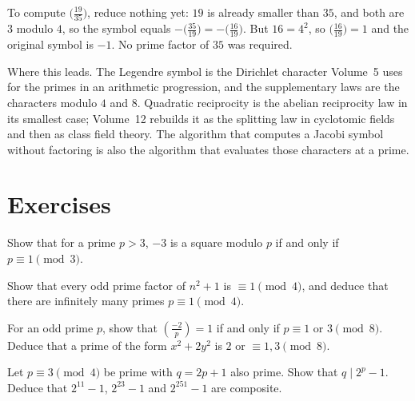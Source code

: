 \begin{examplex}
To compute $\bigl(\frac{19}{35}\bigr)$, reduce nothing yet: $19$ is already smaller than $35$, and both are $3$ modulo $4$, so the symbol equals $-\bigl(\frac{35}{19}\bigr)=-\bigl(\frac{16}{19}\bigr)$.
But $16=4^2$, so $\bigl(\frac{16}{19}\bigr)=1$ and the original symbol is $-1$.
No prime factor of $35$ was required.
\end{examplex}

\begin{beauty}
Where this leads. The Legendre symbol is the Dirichlet character Volume~5 uses for the primes in an arithmetic progression, and the supplementary laws are the characters modulo $4$ and $8$. Quadratic reciprocity is the abelian reciprocity law in its smallest case; Volume~12 rebuilds it as the splitting law in cyclotomic fields and then as class field theory. The algorithm that computes a Jacobi symbol without factoring is also the algorithm that evaluates those characters at a prime.
\end{beauty}

\section{Exercises}

\begin{exercise}[$\star$]\label{ex:minus3}
Show that for a prime $p>3$, $-3$ is a square modulo $p$ if and only if $p\equiv1\pmod3$.
\end{exercise}

\begin{exercise}[$\star$]\label{ex:onemod4}
Show that every odd prime factor of $n^2+1$ is $\equiv1\pmod4$, and deduce that there are infinitely many primes $p\equiv1\pmod4$.
\end{exercise}

\begin{exercise}[$\star\star$]\label{ex:minus2}
For an odd prime $p$, show that $\left(\frac{-2}p\right)=1$ if and only if $p\equiv1$ or $3\pmod8$. Deduce that a prime of the form $x^2+2y^2$ is $2$ or $\equiv1,3\pmod8$.
\end{exercise}

\begin{exercise}[$\star\star$]\label{ex:mersfactor}
Let $p\equiv3\pmod4$ be prime with $q=2p+1$ also prime. Show that $q\mid2^p-1$. Deduce that $2^{11}-1$, $2^{23}-1$ and $2^{251}-1$ are composite.
\end{exercise}

